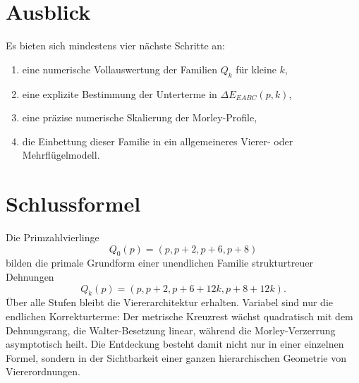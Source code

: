 \documentclass[11pt,a4paper]{article}
\theoremstyle{definition}
\theoremstyle{remark}
\begin{document}
\section{Ausblick}

Es bieten sich mindestens vier nächste Schritte an:
\begin{enumerate}[label=(\arabic*)]
\item eine numerische Vollauswertung der Familien $Q_k$ für kleine $k$,
\item eine explizite Bestimmung der Unterterme in $\Delta E_{EABC}(p,k)$,
\item eine präzise numerische Skalierung der Morley-Profile,
\item die Einbettung dieser Familie in ein allgemeineres Vierer- oder Mehrflügelmodell.
\end{enumerate}

\section*{Schlussformel}

Die Primzahlvierlinge
\[
Q_0(p)=(p,p+2,p+6,p+8)
\]
bilden die primale Grundform einer unendlichen Familie strukturtreuer Dehnungen
\[
Q_k(p)=(p,p+2,p+6+12k,p+8+12k).
\]
Über alle Stufen bleibt die Viererarchitektur erhalten. Variabel sind nur die endlichen Korrekturterme: Der metrische Kreuzrest wächst quadratisch mit dem Dehnungsrang, die Walter-Besetzung linear, während die Morley-Verzerrung asymptotisch heilt. Die Entdeckung besteht damit nicht nur in einer einzelnen Formel, sondern in der Sichtbarkeit einer ganzen hierarchischen Geometrie von Viererordnungen.
\end{document}
